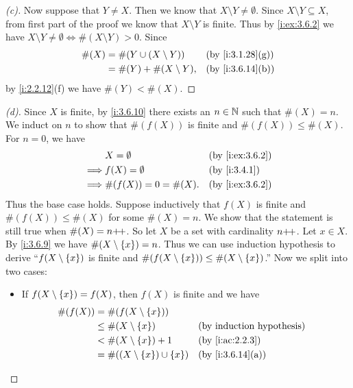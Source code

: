 \begin{proof}[(c)]
  Now suppose that \(Y \neq X\).
  Then we know that \(X \setminus Y \neq \emptyset\).
  Since \(X \setminus Y \subseteq X\), from first part of the proof we know that \(X \setminus Y\) is finite.
  Thus by \cref{i:ex:3.6.2} we have \(X \setminus Y \neq \emptyset \iff \#(X \setminus Y) > 0\).
  Since
  \begin{align*}
    \#(X) & = \#(Y \cup (X \setminus Y)) &  & \by{i:3.1.28}[g] \\
          & = \#(Y) + \#(X \setminus Y), &  & \by{i:3.6.14}[b]
  \end{align*}
  by \cref{i:2.2.12}(f) we have \(\#(Y) < \#(X)\).
\end{proof}

\begin{proof}[(d)]
  Since \(X\) is finite, by \cref{i:3.6.10} there exists an \(n \in \mathbb{N}\) such that \(\#(X) = n\).
  We induct on \(n\) to show that \(\#(f(X))\) is finite and \(\#(f(X)) \leq \#(X)\).
  For \(n = 0\), we have
  \begin{align*}
             & X = \emptyset         &  & \by{i:ex:3.6.2} \\
    \implies & f(X) = \emptyset      &  & \by{i:3.4.1}    \\
    \implies & \#(f(X)) = 0 = \#(X). &  & \by{i:ex:3.6.2}
  \end{align*}
  Thus the base case holds.
  Suppose inductively that \(f(X)\) is finite and \(\#(f(X)) \leq \#(X)\) for some \(\#(X) = n\).
  We show that the statement is still true when \(\#(X) = n{+}\!{+}\).
  So let \(X\) be a set with cardinality \(n{+}\!{+}\).
  Let \(x \in X\).
  By \cref{i:3.6.9} we have \(\#(X \setminus \left\lbrace x\right\rbrace) = n\).
  Thus we can use induction hypothesis to derive ``\(f(X \setminus \left\lbrace x\right\rbrace)\) is finite and \(\#(f(X \setminus \left\lbrace x\right\rbrace)) \leq \#(X \setminus \left\lbrace x\right\rbrace)\).''
  Now we split into two cases:
  \begin{itemize}
    \item If \(f(X \setminus \left\lbrace x\right\rbrace) = f(X)\), then \(f(X)\) is finite and we have
          \begin{align*}
            \#(f(X)) & = \#(f(X \setminus \set{x}))                                   \\
                     & \leq \#(X \setminus \set{x})             &  & \byIH            \\
                     & < \#(X \setminus \set{x}) + 1            &  & \by{i:ac:2.2.3}  \\
                     & = \#((X \setminus \set{x}) \cup \set{x}) &  & \by{i:3.6.14}[a] \\

\end{align*}
\end{itemize}
\end{proof}
